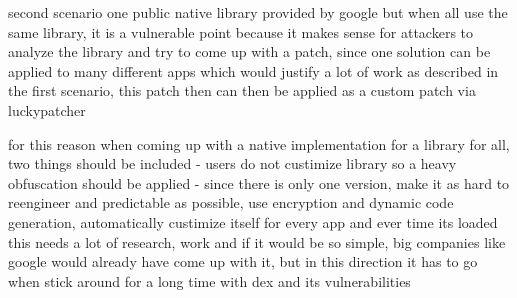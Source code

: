 second scenario
one public native library provided by google
but when all use the same library, it is a vulnerable point because it makes sense for attackers to analyze the library and try to come up with a patch, since one solution can be applied to many different apps which would justify a lot of work as described in the first scenario, this patch then can then be applied as a custom patch via luckypatcher

for this reason when coming up with a native implementation for a library for all, two things should be included
- users do not custimize library so a heavy obfuscation should be applied
- since there is only one version, make it as hard to reengineer and predictable as possible, use encryption and dynamic code generation, automatically custimize itself for every app and ever time its loaded
this needs a lot of research, work and if it would be so simple, big companies like google would already have come up with it, but in this direction it has to go when stick around for a long time with dex and its vulnerabilities
